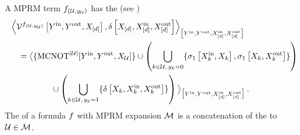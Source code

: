 \begin{lemma}\label{lem:mprmTermRep}
    A MPRM term $f_{(\mathcal{U},y_{\mathcal{U}})}$ has the \computationCircuit{} (see )
    \begin{align*}
        &\left\langle \mathcal{V}^{f_{(\mathcal{U},y_{\mathcal{U}})}}\left[Y^{\mathrm{in}},Y^{\mathrm{out}},X_{[d]}\right],
            \delta\left[X_{[d]},X_{[d]}^{\mathrm{in}},X_{[d]}^{\mathrm{out}}\right]\right\rangle_{\left[ 
            Y^{\mathrm{in}},Y^{\mathrm{out}},X_{[d]}^{\mathrm{in}},X_{[d]}^{\mathrm{out}}
         \right]} \\
        &\quad = \big\langle 
            \{\mathrm{MCNOT}^{\left|\mathcal{U}\right|}[Y^{\mathrm{in}},Y^{\mathrm{out}},X_{\mathcal{U}}]\}
            \cup \left(\bigcup_{k\in\mathcal{U},\,y_{k}=0}\{\sigma_1\left[X_{k}^{\mathrm{in}},X_{k}\right],
                     \sigma_1\left[X_{k},X_{k}^{\mathrm{out}}\right]\}\right) \\
            &\quad\quad\quad\quad\quad \cup \left(\bigcup_{k\in\mathcal{U},\,y_{k}=1}\{
                                                \delta\left[X_{k},X_{k}^{\mathrm{in}},X_{k}^{\mathrm{out}}\right]
                                                \}\right)
         \big\rangle_{\big[ 
            Y^{\mathrm{in}},Y^{\mathrm{out}},X_{[d]}^{\mathrm{in}},X_{[d]}^{\mathrm{out}}
         \big]} \, .
    \end{align*}
    The \computationCircuit{} of a formula $f$ with MPRM expansion $\mathcal{M}$ is a concatenation of the \computationCircuits{} to $\mathcal{U}\in\mathcal{M}$.
\end{lemma}
